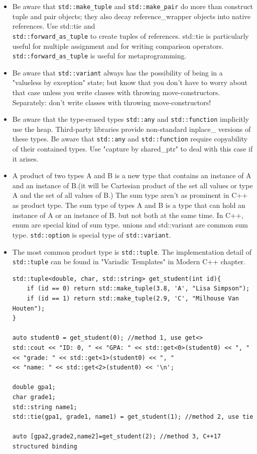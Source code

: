 \documentclass[a4paper,11pt,twoside]{book}
\begin{document}
\begin{itemize}
	\item Be aware that \texttt{std::make\_tuple} and \texttt{std::make\_pair} do more than construct tuple and pair objects; they also decay reference\_wrapper objects into native references. Use std::tie and \\ \texttt{std::forward\_as\_tuple} to create tuples of references. std::tie is particularly useful for multiple assignment and for writing comparison operators. \texttt{std::forward\_as\_tuple} is useful for metaprogramming.
	
	\item Be aware that \texttt{std::variant} always has the possibility of being in a "valueless by exception" state; but know that you don't have to worry about that case unless you write classes with throwing move-constructors. Separately: don't write classes with throwing move-constructors! 
	
	\item Be aware that the type-erased types \texttt{std::any} and \texttt{std::function} implicitly use the heap. Third-party libraries provide non-standard inplace\_ versions of these types. Be aware that \texttt{std::any} and \texttt{std::function} require copyability of their contained types. Use "capture by shared\_ptr" to deal with this case if it arises.
	
	\item  A product of two types A and B is a new type that contains an instance of A and an instance of B.(it will be Cartesian product of the set all values or type A and the set of all values of B.) The sum type aren't as prominent in C++ as product type. The sum type of types A and B is a type that can hold an instance of A or an instance of B. but not both at the same time. In C++, enum are special kind of sum type. unions and std::variant are common sum type. \texttt{std::option} is special type of \texttt{std::variant}.  
	
	\item The most common product type is \texttt{std::tuple}. The implementation detail of \texttt{std::tuple} can be found in "Variadic Templates" in Modern C++ chapter. 
	
\begin{lstlisting}
std::tuple<double, char, std::string> get_student(int id){
	if (id == 0) return std::make_tuple(3.8, 'A', "Lisa Simpson");
	if (id == 1) return std::make_tuple(2.9, 'C', "Milhouse Van Houten");
}

auto student0 = get_student(0); //method 1, use get<>
std::cout << "ID: 0, " << "GPA: " << std::get<0>(student0) << ", "
<< "grade: " << std::get<1>(student0) << ", "
<< "name: " << std::get<2>(student0) << '\n';

double gpa1;
char grade1;
std::string name1;
std::tie(gpa1, grade1, name1) = get_student(1); //method 2, use tie

auto [gpa2,grade2,name2]=get_student(2); //method 3, C++17 structured binding
\end{lstlisting}

\end{itemize}
\end{document}
